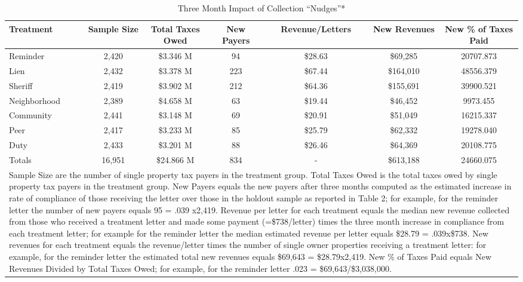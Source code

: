 \begin{table}[htb]
\centering
\caption{Three Month Impact of Collection ``Nudges''*} 
\label{sh_rev}
\begin{tabular}{lcccccc}
 Treatment & Sample Size & Total Taxes Owed & New Payers & Revenue/Letters & New Revenues & New \% of Taxes Paid \\ 
  \hline
Reminder & 2,420 & \$3.346 M & 94 & \$28.63 & \$69,285 & 20707.873 \\ 
   \hline
Lien & 2,432 & \$3.378 M & 223 & \$67.44 & \$164,010 & 48556.379 \\ 
  Sheriff & 2,419 & \$3.902 M & 212 & \$64.36 & \$155,691 & 39900.521 \\ 
  Neighborhood & 2,389 & \$4.658 M & 63 & \$19.44 & \$46,452 & 9973.455 \\ 
  Community & 2,441 & \$3.148 M & 69 & \$20.91 & \$51,049 & 16215.337 \\ 
  Peer & 2,417 & \$3.233 M & 85 & \$25.79 & \$62,332 & 19278.040 \\ 
  Duty & 2,433 & \$3.201 M & 88 & \$26.46 & \$64,369 & 20108.775 \\ 
   \hline
   \hline
Totals & 16,951 & \$24.866 M & 834 & - & \$613,188 & 24660.075 \\ 
   \hline
\multicolumn{7}{p{1\textwidth}}{\scriptsize* Sample Size are the number of single property tax payers in the treatment group.  Total Taxes Owed is the  total taxes owed by single property tax payers in the treatment group. New Payers equals the new payers after three months computed as the estimated increase in rate of compliance of those receiving the letter over those in the holdout sample as reported in Table 2; for example, for the reminder letter the number of new payers equals 95 = .039 x2,419.  Revenue per letter for each treatment equals the median new revenue collected from those who received a treatment letter and made some payment (=\$738/letter) times the three month increase in compliance from each treatment letter; for example for the reminder letter the median estimated revenue per letter equals \$28.79 = .039x\$738.  New revenues for each treatment equals the revenue/letter times the number of single owner properties receiving a treatment letter: for example, for the reminder letter the estimated total new revenues equals \$69,643 = \$28.79x2,419. New \% of Taxes Paid equals New Revenues Divided by Total Taxes Owed; for example, for the reminder letter .023 = \$69,643/\$3,038,000.}
\end{tabular}
\end{table}

